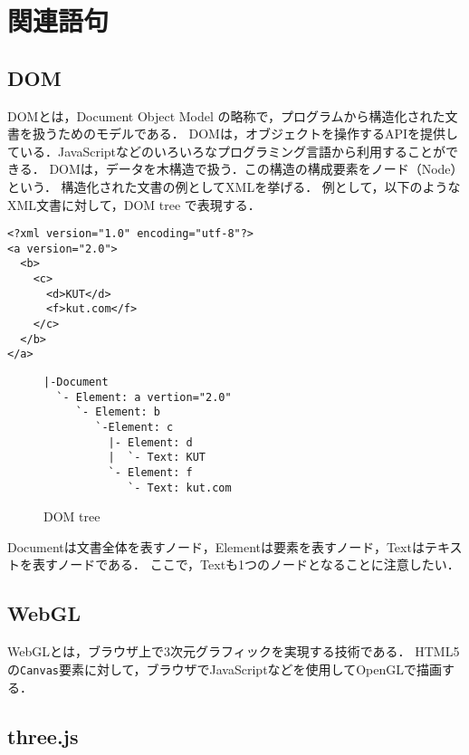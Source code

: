 \section{関連語句}
\subsection{DOM}
DOMとは，Document Object Model の略称で，プログラムから構造化された文書を扱うためのモデルである．
DOMは，オブジェクトを操作するAPIを提供している．JavaScriptなどのいろいろなプログラミング言語から利用することができる．
DOMは，データを木構造で扱う．この構造の構成要素をノード（Node）という．
構造化された文書の例としてXMLを挙げる．
例として，以下のようなXML文書に対して，DOM tree で表現する．
\begin{lstlisting}[caption={XML文書}]
<?xml version="1.0" encoding="utf-8"?>
<a version="2.0">
  <b>
    <c>
      <d>KUT</d>
      <f>kut.com</f>
    </c>
  </b>
</a>
\end{lstlisting}
\begin{figure}[H]
    \begin{framed}
        \centering
        \begin{verbatim}
|-Document
  `- Element: a vertion="2.0"
     `- Element: b
        `-Element: c
          |- Element: d
          |  `- Text: KUT
          `- Element: f   
             `- Text: kut.com
\end{verbatim}
    \end{framed}
    \caption{DOM tree}
\end{figure}
Documentは文書全体を表すノード，Elementは要素を表すノード，Textはテキストを表すノードである．
ここで，Textも1つのノードとなることに注意したい．
\\\hfill\cite{XML文書とDOM}
\subsection{WebGL}
WebGLとは，ブラウザ上で3次元グラフィックを実現する技術である\cite{webglみずほ}．
HTML5の\texttt{Canvas}要素に対して，ブラウザでJavaScriptなどを使用してOpenGLで描画する．
\subsection{three.js}